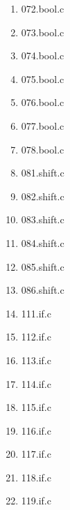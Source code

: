 \begin{multicols}{5}
\begin{enumerate}
        \item 072.bool.c
        \item 073.bool.c
        \item 074.bool.c
        \item 075.bool.c
        \item 076.bool.c
        \item 077.bool.c
        \item 078.bool.c
        \item 081.shift.c
        \item 082.shift.c
        \item 083.shift.c
        \item 084.shift.c
        \item 085.shift.c
        \item 086.shift.c
        \item 111.if.c
        \item 112.if.c
        \item 113.if.c
        \item 114.if.c
        \item 115.if.c
        \item 116.if.c
        \item 117.if.c
        \item 118.if.c
        \item 119.if.c
    \end{enumerate}
\end{multicols} 

